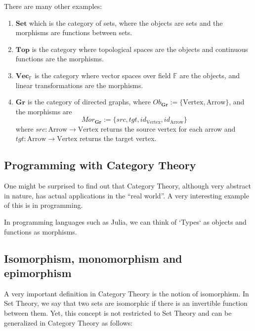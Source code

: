 There are many other examples:
\begin{enumerate}[1.]
  \item $\mathbf{Set}$ which is the category of sets, where the objects are sets and the morphisms are functions between sets.
  \item $\mathbf{Top}$ is the category where topological spaces are the objects and continuous functions are the morphisms.
  \item $\mathbf{Vec}_\mathbb F$ is the category where vector spaces over field $\mathbb F$ are the objects,
    and linear transformations are the morphisms.
  \item $\mathbf{Gr}$ is the category of directed graphs, where $Ob_{\mathbf{Gr}} := \{\text{Vertex}, \text{Arrow}\}$,
    and the morphisms are
    \begin{displaymath}
      Mor_{\mathbf{Gr}} := \{
        src,
        tgt,
        id_{\text{Vertex}},
        id_{\text{Arrow}}
      \}
    \end{displaymath}
    where $src:\text{Arrow} \to \text{Vertex}$ returns the source vertex for each arrow and
    $tgt:\text{Arrow} \to \text{Vertex}$ returns the target vertex.
\end{enumerate}


\subsection{Programming with Category Theory}

One might be surprised to find out that Category Theory,
although very abstract in nature, has actual applications in the
``real world''. A very interesting example of this is in programming.

In programming languages such as Julia, we can think of `Types`
as objects and functions as morphisms.

\subsection{Isomorphism, monomorphism and epimorphism}

A very important definition in Category Theory is the notion of isomorphism.
In Set Theory, we say that two sets are isomorphic if there is an invertible
function between them. Yet, this concept is not restricted to Set Theory
and can be generalized in Category Theory as follows:

